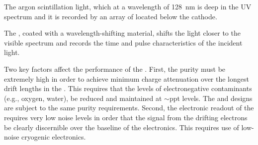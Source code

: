 The argon scintillation light, which at a wavelength of  \SI{128}{nm} is deep in the UV spectrum and it is recorded by an array of  located below the cathode. %

The , coated with a wavelength-shifting material, shifts the light  closer to the visible spectrum and records the time and pulse characteristics of the incident light.


Two key factors affect the performance of the  \lartpc{}.  First, the \lar purity must be extremely high in order to achieve minimum charge attenuation over the longest drift lengths in the \lartpc{}.  This requires that the levels of electronegative contaminants (e.g., oxygen, water), be reduced and
maintained at $\sim$ppt levels.  The \dual and \single designs are subject to the same purity requirements. 
%
Second, the electronic readout
of the \lartpc{} requires very low noise levels in order that the signal from the drifting electrons
be clearly discernible over the baseline of the electronics.  This requires use of low-noise cryogenic electronics. 


